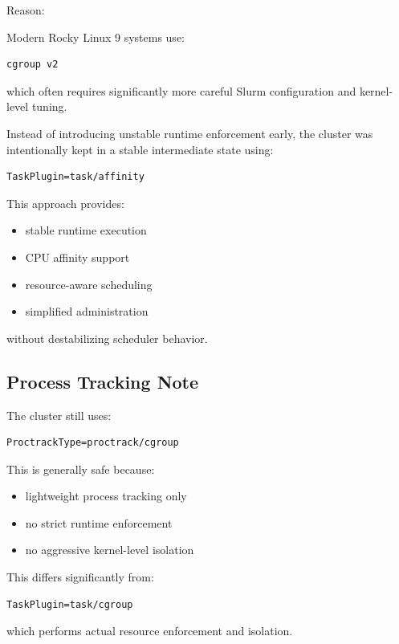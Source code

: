 \documentclass[11pt]{article}
\begin{document}
Reason:

Modern Rocky Linux 9 systems use:

\begin{verbatim}
cgroup v2
\end{verbatim}

which often requires significantly more careful Slurm configuration and
kernel-level tuning.

Instead of introducing unstable runtime enforcement early, the cluster
was intentionally kept in a stable intermediate state using:

\begin{verbatim}
TaskPlugin=task/affinity
\end{verbatim}

This approach provides:

\begin{itemize}
\item stable runtime execution
\item CPU affinity support
\item resource-aware scheduling
\item simplified administration
\end{itemize}

without destabilizing scheduler behavior.
\subsection{Process Tracking Note}
\label{sec:org3276f1c}

The cluster still uses:

\begin{verbatim}
ProctrackType=proctrack/cgroup
\end{verbatim}

This is generally safe because:

\begin{itemize}
\item lightweight process tracking only
\item no strict runtime enforcement
\item no aggressive kernel-level isolation
\end{itemize}

This differs significantly from:

\begin{verbatim}
TaskPlugin=task/cgroup
\end{verbatim}

which performs actual resource enforcement and isolation.
\end{document}
